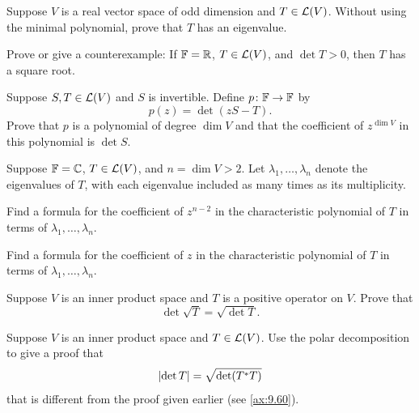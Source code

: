 \begin{exercise}
Suppose $V$ is a real vector space of odd dimension and $T\in\mathcal{L}(V)$. Without
using the minimal polynomial, prove that $T$ has an eigenvalue.
\end{exercise}

\begin{exercise}
Prove or give a counterexample: If $\mathbb{F}=\mathbb{R}$, $T\in\mathcal{L}(V)$, and $\det T>0$, then
$T$ has a square root.
\end{exercise}

\begin{exercise}
Suppose $S,T\in\mathcal{L}(V)$ and $S$ is invertible. Define $p\colon\mathbb{F}\to\mathbb{F}$ by
\[ p(z) = \det(zS-T). \]
Prove that $p$ is a polynomial of degree $\dim V$ and that the coefficient of
$z^{\dim V}$ in this polynomial is $\det S$.
\end{exercise}

\begin{exercise}
Suppose $\mathbb{F}=\mathbb{C}$, $T\in\mathcal{L}(V)$, and $n=\dim V>2$. Let
$\lambda_1,\dots,\lambda_n$ denote the eigenvalues of $T$, with each eigenvalue
included as many times as its multiplicity.
\begin{parts}
\item Find a formula for the coefficient of $z^{n-2}$ in the characteristic
  polynomial of $T$ in terms of $\lambda_1,\dots,\lambda_n$.
\item Find a formula for the coefficient of $z$ in the characteristic
  polynomial of $T$ in terms of $\lambda_1,\dots,\lambda_n$.
\end{parts}
\end{exercise}

\begin{exercise}
Suppose $V$ is an inner product space and $T$ is a positive operator on $V$.
Prove that
\[ \det\sqrt{T} = \sqrt{\det T}. \]
\end{exercise}

\begin{exercise}
Suppose $V$ is an inner product space and $T\in\mathcal{L}(V)$. Use the polar
decomposition to give a proof that
\[ \lvert \operatorname{det} T \rvert = \sqrt{\operatorname{det}(T^*T)} \]
that is different from the proof given earlier (see \ref{ax:9.60}).
\end{exercise}

